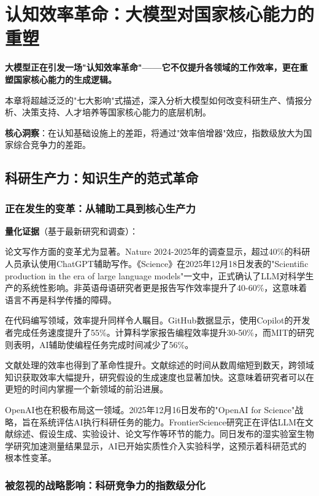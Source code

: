 \chapter{认知效率革命：大模型对国家核心能力的重塑}

\textbf{大模型正在引发一场"认知效率革命"——它不仅提升各领域的工作效率，更在重塑国家核心能力的生成逻辑。}

本章将超越泛泛的"七大影响"式描述，深入分析大模型如何改变科研生产、情报分析、决策支持、人才培养等国家核心能力的底层机制。

\textbf{核心洞察}：在认知基础设施上的差距，将通过"效率倍增器"效应，指数级放大为国家综合竞争力的差距。

\section{科研生产力：知识生产的范式革命}

\subsection{正在发生的变革：从辅助工具到核心生产力}

\textbf{量化证据}（基于最新研究和调查）：

论文写作方面的变革尤为显著。Nature 2024-2025年的调查显示，超过40\%的科研人员承认使用ChatGPT辅助写作。《Science》在2025年12月18日发表的"Scientific production in the era of large language models"一文中，正式确认了LLM对科学生产的系统性影响。非英语母语研究者更是报告写作效率提升了40-60\%，这意味着语言不再是科学传播的障碍。

在代码编写领域，效率提升同样令人瞩目。GitHub数据显示，使用Copilot的开发者完成任务速度提升了55\%。计算科学家报告编程效率提升30-50\%，而MIT的研究则表明，AI辅助使编程任务完成时间减少了56\%。

文献处理的效率也得到了革命性提升。文献综述的时间从数周缩短到数天，跨领域知识获取效率大幅提升，研究假设的生成速度也显著加快。这意味着研究者可以在更短的时间内掌握一个新领域的前沿进展。

OpenAI也在积极布局这一领域。2025年12月16日发布的"OpenAI for Science"战略，旨在系统评估AI执行科研任务的能力。FrontierScience研究正在评估LLM在文献综述、假设生成、实验设计、论文写作等环节的能力。同日发布的湿实验室生物学研究加速测量结果显示，AI已开始实质性介入实验科学，这预示着科研范式的根本性变革。

\subsection{被忽视的战略影响：科研竞争力的指数级分化}

